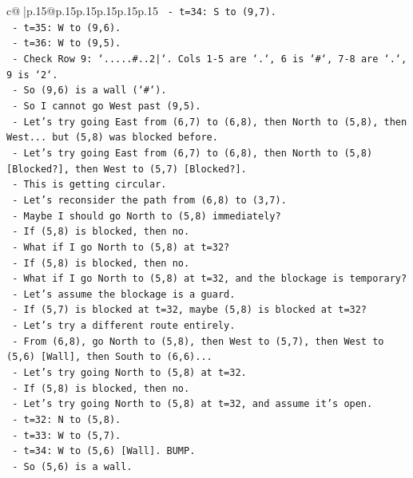 \documentclass{article}
\begin{document}
{\begin{supertabular}{c@{$\;$}|p{.15\linewidth}@{}p{.15\linewidth}p{.15\linewidth}p{.15\linewidth}p{.15\linewidth}p{.15\linewidth}}
{{{\texttt{  {-} t=34: S to (9,7).} \\
\texttt{  {-} t=35: W to (9,6).} \\
\texttt{  {-} t=36: W to (9,5).} \\
\texttt{  {-} Check Row 9: `.....\#..2|`. Cols 1{-}5 are `.`, 6 is `\#`, 7{-}8 are `.`, 9 is `2`.} \\
\texttt{  {-} So (9,6) is a wall (`\#`).} \\
\texttt{  {-} So I cannot go West past (9,5).} \\
\texttt{  {-} Let's try going East from (6,7) to (6,8), then North to (5,8), then West... but (5,8) was blocked before.} \\
\texttt{  {-} Let's try going East from (6,7) to (6,8), then North to (5,8) {[}Blocked?{]}, then West to (5,7) {[}Blocked?{]}.} \\
\texttt{  {-} This is getting circular.} \\
\texttt{  {-} Let's reconsider the path from (6,8) to (3,7).} \\
\texttt{  {-} Maybe I should go North to (5,8) immediately?} \\
\texttt{  {-} If (5,8) is blocked, then no.} \\
\texttt{  {-} What if I go North to (5,8) at t=32?} \\
\texttt{  {-} If (5,8) is blocked, then no.} \\
\texttt{  {-} What if I go North to (5,8) at t=32, and the blockage is temporary?} \\
\texttt{  {-} Let's assume the blockage is a guard.} \\
\texttt{  {-} If (5,7) is blocked at t=32, maybe (5,8) is blocked at t=32?} \\
\texttt{  {-} Let's try a different route entirely.} \\
\texttt{  {-} From (6,8), go North to (5,8), then West to (5,7), then West to (5,6) {[}Wall{]}, then South to (6,6)...} \\
\texttt{  {-} Let's try going North to (5,8) at t=32.} \\
\texttt{  {-} If (5,8) is blocked, then no.} \\
\texttt{  {-} Let's try going North to (5,8) at t=32, and assume it's open.} \\
\texttt{  {-} t=32: N to (5,8).} \\
\texttt{  {-} t=33: W to (5,7).} \\
\texttt{  {-} t=34: W to (5,6) {[}Wall{]}. BUMP.} \\
\texttt{  {-} So (5,6) is a wall.} \\
}}}
\end{supertabular}}
\end{document}
